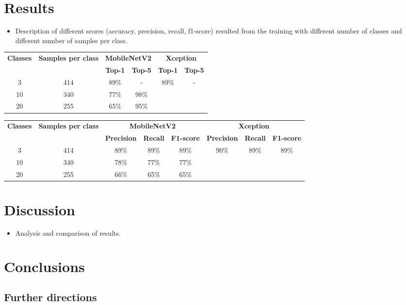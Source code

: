 \documentclass[12pt]{llncs}
\begin{document}
\section{Results}
\begin{itemize}
\item Description of different scores (accuracy, precision, recall, f1-score) resulted from the training with different number of classes and different number of samples per class.
\end{itemize}
\begin{center}
\begin{tabular}{ |c|c|c|c|c|c| } 
 \hline
 \multirow{2}{4em}{\textbf{Classes}} & \multirow{2}{6em}{\textbf{Samples per class}} & \multicolumn{2}{|c|}{\textbf{MobileNetV2}} & \multicolumn{2}{|c|}{\textbf{Xception}} \\ 
 \cline{3-6}
 & & \textbf{Top-1} & \textbf{Top-5} & \textbf{Top-1} & \textbf{Top-5} \\
 \hline 
 3 & 414 & 89\% & - & 89\% & - \\ 
 \hline 
 10 & 340 & 77\% & 98\% & & \\
 \hline 
 20 & 255 & 65\% & 95\% & & \\
 \hline
\end{tabular}

\begin{tabular}{ |c|c|c|c|c|c|c|c| } 
 \hline
 \multirow{2}{4em}{\textbf{Classes}} & \multirow{2}{6em}{\textbf{Samples per class}} & \multicolumn{3}{|c|}{\textbf{MobileNetV2}} & \multicolumn{3}{|c|}{\textbf{Xception}} \\ 
 \cline{3-8}
 & & \textbf{Precision} & \textbf{Recall} & \textbf{F1-score} & \textbf{Precision} & \textbf{Recall} & \textbf{F1-score} \\
 \hline 
 3 & 414 & 89\% & 89\% & 89\% & 90\% & 89\% & 89\% \\ 
 \hline 
 10 & 340 & 78\% & 77\% & 77\% & & & \\
 \hline 
 20 & 255 & 66\% & 65\% & 65\% & & & \\
 \hline
\end{tabular}

\end{center}

\section{Discussion}
\begin{itemize}
\item Analysis and comparison of results.
\end{itemize}

\section{Conclusions}

\subsection*{Further directions}

\printbibliography[title={References}]
\end{document}
